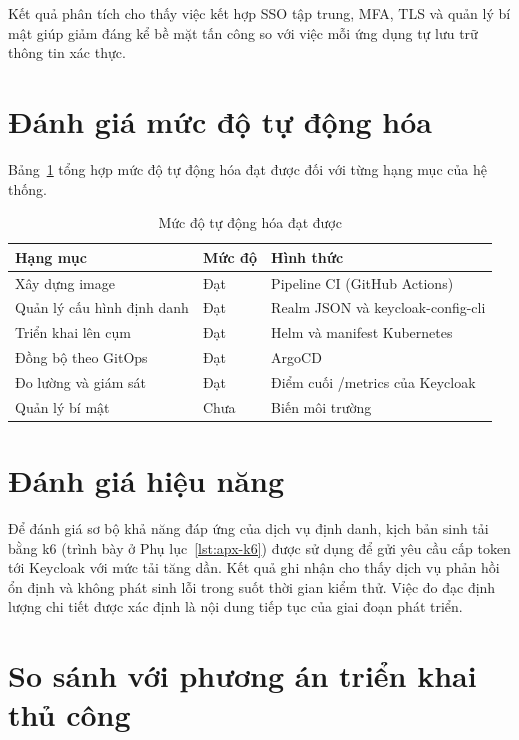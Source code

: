 Kết quả phân tích cho thấy việc kết hợp SSO tập trung, MFA, TLS và quản lý bí
mật giúp giảm đáng kể bề mặt tấn công so với việc mỗi ứng dụng tự lưu trữ thông
tin xác thực.

\section{Đánh giá mức độ tự động hóa}
\label{sec:autoscore}

Bảng~\ref{tab:autoscore} tổng hợp mức độ tự động hóa đạt được đối với từng hạng
mục của hệ thống.

\begin{table}[htbp]
\centering
\caption{Mức độ tự động hóa đạt được}
\label{tab:autoscore}
\small
\begin{tabular}{p{6.0cm} p{2.8cm} p{3.8cm}}
\toprule
\textbf{Hạng mục} & \textbf{Mức độ} & \textbf{Hình thức}\\
\midrule
Xây dựng image & Đạt & Pipeline CI (GitHub Actions)\\
Quản lý cấu hình định danh & Đạt & Realm JSON và keycloak-config-cli\\
Triển khai lên cụm & Đạt & Helm và manifest Kubernetes\\
Đồng bộ theo GitOps & Đạt & ArgoCD\\
Đo lường và giám sát & Đạt & Điểm cuối /metrics của Keycloak\\
Quản lý bí mật & Chưa & Biến môi trường\\
\bottomrule
\end{tabular}
\end{table}

\section{Đánh giá hiệu năng}
\label{sec:hieunang}

Để đánh giá sơ bộ khả năng đáp ứng của dịch vụ định danh, kịch bản sinh tải bằng
k6 (trình bày ở Phụ lục~\ref{lst:apx-k6}) được sử dụng để gửi yêu cầu cấp token
tới Keycloak với mức tải tăng dần. Kết quả ghi nhận cho thấy dịch vụ phản hồi ổn
định và không phát sinh lỗi trong suốt thời gian kiểm thử. Việc đo đạc định
lượng chi tiết được xác định là nội dung tiếp tục của giai đoạn phát triển.

\section{So sánh với phương án triển khai thủ công}
\label{sec:sosanh}

